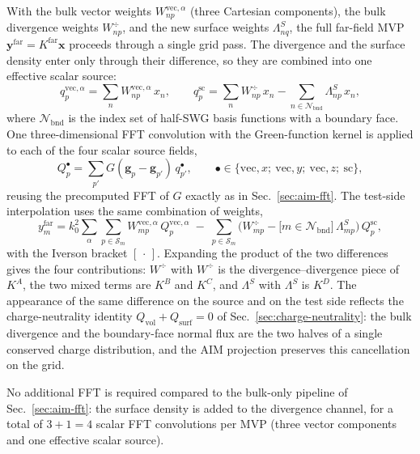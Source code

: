 \documentclass[11pt,a4paper]{article}
\begin{document}
With the bulk vector weights $W^{\text{vec},\alpha}_{np}$ (three
Cartesian components), the bulk divergence weights $W^{\div}_{np}$,
and the new surface weights $\Lambda^{S}_{nq}$, the full far-field MVP
$\bm{y}^{\text{far}} = K^{\text{far}}\bm{x}$ proceeds through a single
grid pass. The divergence and the surface density enter only through
their difference, so they are combined into one effective scalar
source:
\begin{equation}
  q^{\text{vec},\alpha}_p = \sum_{n} W^{\text{vec},\alpha}_{np}\,x_n,
  \qquad
  q^{\text{sc}}_p = \sum_{n} W^{\div}_{np}\,x_n
    - \sum_{n\in\mathcal{N}_{\text{bnd}}} \Lambda^{S}_{np}\,x_n,
  \label{eq:aim-surf-proj}
\end{equation}
where $\mathcal{N}_{\text{bnd}}$ is the index set of half-SWG basis
functions with a boundary face. One three-dimensional FFT convolution
with the Green-function kernel is applied to each of the four scalar
source fields,
\begin{equation}
  Q^{\bullet}_p = \sum_{p'} G(\bm{g}_p - \bm{g}_{p'})\,q^{\bullet}_{p'},
  \qquad
  \bullet\in\{\text{vec},x;\ \text{vec},y;\ \text{vec},z;\ \text{sc}\},
  \label{eq:aim-surf-fft}
\end{equation}
reusing the precomputed FFT of $G$ exactly as in
Sec.~\ref{sec:aim-fft}. The test-side interpolation uses the same
combination of weights,
\begin{equation}
  y_m^{\text{far}}
  = k_0^{2}\sum_{\alpha}\sum_{p\in\mathcal{S}_m}
     W^{\text{vec},\alpha}_{mp}\,Q^{\text{vec},\alpha}_p
  \;-\; \sum_{p\in\mathcal{S}_m}
     \bigl(W^{\div}_{mp} - \bigl[m\in\mathcal{N}_{\text{bnd}}\bigr]\,
           \Lambda^{S}_{mp}\bigr)\,Q^{\text{sc}}_p ,
  \label{eq:aim-surf-mvp}
\end{equation}
with the Iverson bracket $[\,\cdot\,]$. Expanding the product of the two
differences gives the four contributions: $W^{\div}$ with $W^{\div}$ is
the divergence--divergence piece of $K^{A}$, the two mixed terms are
$K^{B}$ and $K^{C}$, and $\Lambda^{S}$ with $\Lambda^{S}$ is $K^{D}$. The
appearance of the same difference on the source and on the test side
reflects the charge-neutrality identity
$Q_{\text{vol}} + Q_{\text{surf}} = 0$ of
Sec.~\ref{sec:charge-neutrality}: the bulk divergence and the
boundary-face normal flux are the two halves of a single conserved
charge distribution, and the AIM projection preserves this
cancellation on the grid.

No additional FFT is required compared to the bulk-only pipeline of
Sec.~\ref{sec:aim-fft}: the surface density is added to the divergence
channel, for a total of $3 + 1 = 4$ scalar FFT convolutions per MVP
(three vector components and one effective scalar source).
\end{document}
